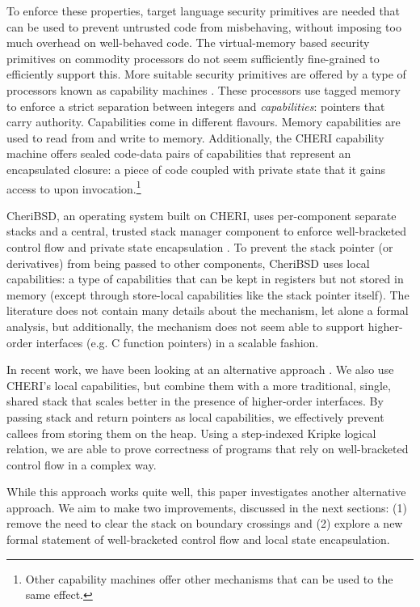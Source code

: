 \documentclass[sigplan,screen]{acmart}
\begin{document}
To enforce these properties, target language security primitives are needed that can be used to prevent untrusted code from misbehaving, without imposing too much overhead on well-behaved code.
The virtual-memory based security primitives on commodity processors do not seem sufficiently fine-grained to efficiently support this.
More suitable security primitives are offered by a type of processors known as capability machines \citep{levy_capability-based_1984,watson_cheri:_2015}.
These processors use tagged memory to enforce a strict separation between integers and \emph{capabilities}: pointers that carry authority.
Capabilities come in different flavours.
Memory capabilities are used to read from and write to memory.
Additionally, the CHERI capability machine offers sealed code-data pairs of capabilities that represent an encapsulated closure: a piece of code coupled with private state that it gains access to upon invocation.\footnote{Other capability machines offer other mechanisms that can be used to the same effect.} 

CheriBSD, an operating system built on CHERI, uses per-component separate stacks and a central, trusted stack manager component to enforce well-bracketed control flow and private state encapsulation \citep{watson_cheri:_2015}.
To prevent the stack pointer (or derivatives) from being passed to other components, CheriBSD uses local capabilities: a type of capabilities that can be kept in registers but not stored in memory (except through store-local capabilities like the stack pointer itself).
The literature does not contain many details about the mechanism, let alone a formal analysis, but additionally, the mechanism does not seem able to support higher-order interfaces (e.g. C function pointers) in a scalable fashion.

In recent work, we have been looking at an alternative approach \citep{skorstengaard_reasoning_2017}.
We also use CHERI's local capabilities, but combine them with a more traditional, single, shared stack that scales better in the presence of higher-order interfaces.
By passing stack and return pointers as local capabilities, we effectively prevent callees from storing them on the heap.
Using a step-indexed Kripke logical relation, we are able to prove correctness of programs that rely on well-bracketed control flow in a complex way.

While this approach works quite well, this paper investigates another alternative approach.
We aim to make two improvements, discussed in the next sections: (1) remove the need to clear the stack on boundary crossings and (2) explore a new formal statement of well-bracketed control flow and local state encapsulation.
\end{document}
